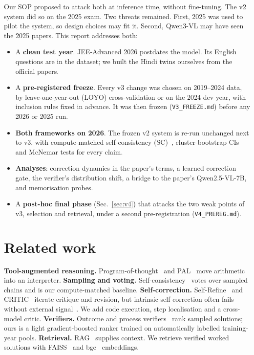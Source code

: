 \documentclass[conference]{IEEEtran}
\begin{document}
Our SOP proposed to attack both at inference time, without fine-tuning. The v2 system did so on
the 2025 exam. Two threats remained. First, 2025 was used to pilot the system, so design choices
may fit it. Second, Qwen3-VL may have seen the 2025 papers. This report addresses both:
\begin{itemize}
\item A \textbf{clean test year}. JEE-Advanced 2026 postdates the model. Its English questions are in
the dataset; we built the Hindi twins ourselves from the official papers.
\item A \textbf{pre-registered freeze}. Every v3 change was chosen on 2019--2024 data, by
leave-one-year-out (LOYO) cross-validation or on the 2024 dev year, with inclusion rules fixed
in advance. It was then frozen (\texttt{V3\_FREEZE.md}) before any 2026 or 2025 run.
\item \textbf{Both frameworks on 2026}. The frozen v2 system is re-run unchanged next to v3, with
compute-matched self-consistency (SC)~\cite{selfconsistency}, cluster-bootstrap CIs and McNemar
tests for every claim.
\item \textbf{Analyses}: correction dynamics in the paper's terms, a learned correction gate, the
verifier's distribution shift, a bridge to the paper's Qwen2.5-VL-7B, and memorisation probes.
\item A \textbf{post-hoc final phase} (Sec.~\ref{sec:v4}) that attacks the two weak points of v3,
selection and retrieval, under a second pre-registration (\texttt{V4\_PREREG.md}).
\end{itemize}

\section{Related work}
\textbf{Tool-augmented reasoning.} Program-of-thought~\cite{pot} and PAL~\cite{pal} move
arithmetic into an interpreter.
\textbf{Sampling and voting.} Self-consistency~\cite{selfconsistency} votes over sampled chains
and is our compute-matched baseline.
\textbf{Self-correction.} Self-Refine~\cite{selfrefine} and CRITIC~\cite{critic} iterate critique
and revision, but intrinsic self-correction often fails without external
signal~\cite{cannotselfcorrect}. We add code execution, step localisation and a cross-model critic.
\textbf{Verifiers.} Outcome and process verifiers~\cite{cobbe,lightman} rank sampled solutions;
ours is a light gradient-boosted ranker trained on automatically labelled training-year pools.
\textbf{Retrieval.} RAG~\cite{rag} supplies context. We retrieve verified worked solutions with
FAISS~\cite{faiss} and bge~\cite{bge} embeddings.
\end{document}
